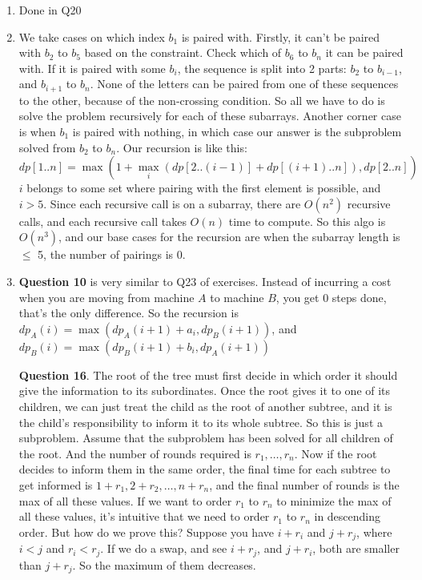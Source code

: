 \documentclass[12pt]{report}
\begin{document}
\begin{enumerate}[label=\textbf{\arabic*.}]
  \item Done in Q20
  
  \item We take cases on which index $b_1$ is paired with. Firstly, it can't be paired with $b_2$ to $b_5$ based on the constraint. Check which of $b_6$ to $b_n$ it can be paired with. If it is paired with some $b_i$, the 
  sequence is split into 2 parts: $b_2$ to $b_{i-1}$, and $b_{i+1}$ to $b_n$. None of the letters can be paired from one of these sequences to the other, because of the non-crossing condition. So all we have to do is solve
  the problem recursively for each of these subarrays. Another corner case is when $b_1$ is paired with nothing, in which case our answer is the subproblem solved from $b_2$ to $b_n$. Our recursion is like this:
  \[dp[1 .. n] = \max(1 + \max_i (dp[2 .. (i-1)] + dp[(i+1) .. n]), dp[2 .. n]) \]
  $i$ belongs to some set where pairing with the first element is possible, and $i > 5$. Since each recursive call is on a subarray, there are $O(n^2)$ recursive calls, and each recursive call takes $O(n)$ time to compute.
  So this algo is $O(n^3)$, and our base cases for the recursion are when the subarray length is $\leq$ 5, the number of pairings is 0.

  \item \textbf{Question 10} is very similar to Q23 of exercises. Instead of incurring a cost when you are moving from machine $A$ to machine $B$, you get $0$ steps done, that's the only difference. So the recursion is 
  $dp_A(i) = \max(dp_A(i+1) + a_i, dp_B(i+1))$, and $dp_B(i) = \max(dp_B(i+1) + b_i, dp_A(i+1))$

  \textbf{Question 16}. The root of the tree must first decide in which order it should give the information to its subordinates. Once the root gives it to one of its children, we can just treat the child as the root of another subtree,
  and it is the child's responsibility to inform it to its whole subtree. So this is just a subproblem. Assume that the subproblem has been solved for all children of the root. And the number of rounds required is $r_1, \dots, 
  r_n$. Now if the root decides to inform them in the same order, the final time for each subtree to get informed is $1 + r_1, 2 + r_2, \dots, n + r_n$, and the final number of rounds is the max of all these values. If we 
  want to order $r_1$ to $r_n$ to minimize the max of all these values, it's intuitive that we need to order $r_1$ to $r_n$ in descending order. But how do we prove this? Suppose you have $i + r_i$ and $j + r_j$, where $i < j$
  and $r_i < r_j$. If we do a swap, and see $i + r_j$, and $j + r_i$, both are smaller than $j + r_j$. So the maximum of them decreases.


\end{enumerate}
\end{document}
